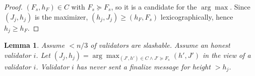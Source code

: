\documentclass{article}
\newcommand{\finalize}{\mathsf{finalize}}
\theoremstyle{plain}
\newtheorem{lemma}{Lemma}
\theoremstyle{definition}
\theoremstyle{remark}
\begin{document}
\begin{proof}
$(F_s, h_F) \in C$ with $F_s \succeq F_s$, so it is a candidate for the $\arg\max$.
Since $(J_j, h_j)$ is the maximizer, $(h_j, J_j) \geq (h_F, F_s)$ lexicographically, hence $h_j \geq h_F$.
\end{proof}







\begin{lemma}
  Assume $< n/3$ of validators are slashable.
  Assume an honest validator $i$.
  Let $(J_j, h_j) = \arg\max_{(J',h')\in C \land J' \succeq F_s}(h', J')$ in the view of a validator $i$.
  Validator $i$ has never sent a finalize message for height $>h_j$.
\end{lemma}
\end{document}
